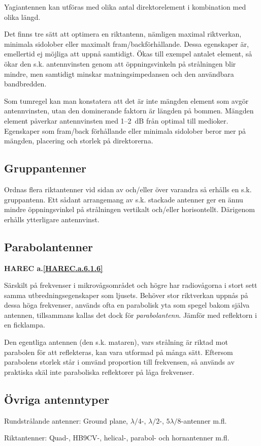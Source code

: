 Yagiantennen kan utföras med olika antal direktorelement i kombination med
olika längd.

Det finns tre sätt att optimera en riktantenn, nämligen maximal
riktverkan, minimala sidolober eller maximalt fram/backförhållande.
Dessa egenskaper är, emellertid ej möjliga att uppnå samtidigt.
Ökas till exempel antalet element, så ökar den s.k. antennvinsten genom att
öppningsvinkeln på strålningen blir mindre, men samtidigt minskar
matningsimpedansen och den användbara bandbredden.

Som tumregel kan man konstatera att det är inte mängden element som
avgör antennvinsten, utan den dominerande faktorn är längden på bommen.
Mängden element påverkar antennvinsten med 1--2~dB från optimal till
medioker.
Egenskaper som fram/back förhållande eller minimala sidolober beror mer
på mängden, placering och storlek på direktorerna.

\subsection{Gruppantenner}

Ordnas flera riktantenner vid sidan av och/eller över varandra så
erhålls en s.k. gruppantenn.
Ett sådant arrangemang av s.k. stackade antenner ger en ännu mindre
öppningsvinkel på strålningen vertikalt och/eller horisontellt.
Därigenom erhålls ytterligare antennvinst.

\subsection{Parabolantenner}
\textbf{
HAREC a.\ref{HAREC.a.6.1.6}\label{myHAREC.a.6.1.6}
}

Särskilt på frekvenser i mikrovågsområdet och högre har radiovågorna i
stort sett samma utbredningsegenskaper som ljusets.
Behöver stor riktverkan uppnås på dessa höga frekvenser, används ofta en
parabolisk yta som spegel bakom själva antennen, tillsammans kallas det dock
för \emph{parabolantenn}.
Jämför med reflektorn i en ficklampa.

Den egentliga antennen (den s.k. mataren), vars strålning är riktad
mot parabolen för att reflekteras, kan vara utformad på många sätt.
Eftersom parabolens storlek står i omvänd proportion till frekvensen, så
används av praktiska skäl inte paraboliska reflektorer på låga frekvenser.

\subsection{Övriga antenntyper}

Rundstrålande antenner: Ground plane, \(\lambda/4\)-, \(\lambda/2\)-,
\(5\lambda/8\)-antenner m.fl.

Riktantenner: Quad-, HB9CV-, helical-, parabol- och hornantenner m.fl.
